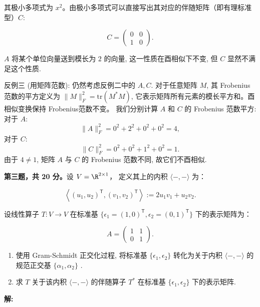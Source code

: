 \begin{enumerate}
其极小多项式为 \(x^{2}\)。由极小多项式可以直接写出其对应的伴随矩阵（即有理标准型）$C$:

\[C = \begin{pmatrix} 0 & 0 \\ 1 & 0 \end{pmatrix}.\]

$A$ 将某个单位向量送到模长为 $2$ 的向量, 这一性质在酉相似下不变, 
但 $C$ 显然不满足这个性质.

反例三 (用矩阵范数): 仍然考虑反例二中的 \(A, C\). 
对于任意矩阵 \(M\), 其 Frobenius 范数的平方定义为 
\(\|M\|_F^2 = \mathrm{tr}(M^* M)\), 
它表示矩阵所有元素的模长平方和。酉相似变换保持 Frobenius范数不变。
我们分别计算 \(A\) 和 \(C\) 的 Frobenius 范数平方: 
对于 \(A\): \[\|A\|_F^2 = 0^2 + 2^2 + 0^2 + 0^2 = 4,\]
对于 \(C\): \[\|C\|_F^2 = 0^2 + 0^2 + 1^2 + 0^2 = 1.\]
由于 \(4 \neq 1\), 矩阵 \(A\) 与 \(C\) 的 Frobenius 范数不同, 故它们不酉相似.
\end{enumerate}

\textbf{第三题，共 20 分。}设 \(V = \R^{2 \times 1}\)，
定义其上的内积 \(\langle -, - \rangle\) 为：

\[\left\langle \left(u_ {1}, u_{2}\right)^{\mathsf {T}}, \left(v_{1}, v_{2}\right)^{\mathsf {T}} \right\rangle := 2u_{1}v_{1} + u_{2}v_{2}.\]

设线性算子 \(T: V \to V\) 在标准基
\(\{\epsilon_1 = (1,0)^{\mathsf {T}}, \epsilon_2 = (0,1)^{\mathsf {T}}\}\)
下的表示矩阵为：

\[
A = \begin{pmatrix} 1 & 1 \\ 0 & 1 \end{pmatrix}.
\]

\begin{enumerate}
\def\labelenumi{\arabic{enumi}.}
\item
  使用 Gram-Schmidt 正交化过程, 将标准基 \(\{\epsilon_1, \epsilon_2\}\)
  转化为关于内积 \(\langle -, - \rangle\) 的规范正交基
  \(\{\alpha_1, \alpha_2\}\) .
\item
  求 \(T\) 关于该内积 \(\langle -, - \rangle\) 的伴随算子 \(T^{*}\)
  在标准基 \(\{\epsilon_1, \epsilon_2\}\) 下的表示矩阵.
\end{enumerate}

\textbf{解:}

